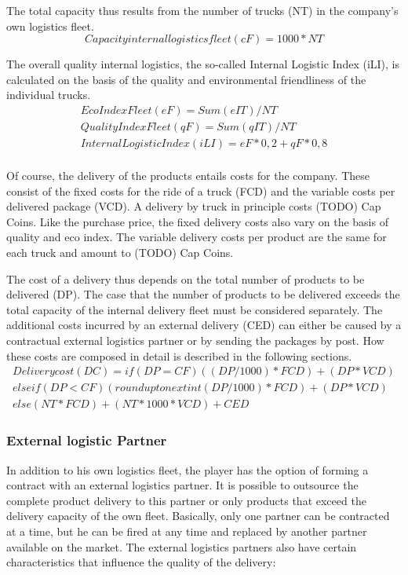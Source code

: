 The total capacity thus results from the number of trucks (NT) in the company's own logistics fleet. 
\begin{equation}
    Capacity internal logistics fleet (cF) = 1000 * NT
\end{equation}

The overall quality internal logistics, the so-called Internal Logistic Index (iLI), is calculated on the basis of the quality and environmental friendliness of the individual trucks.  
\begin{equation}
\begin{aligned}
    Eco Index Fleet (eF) = Sum (eIT) / NT \\
    Quality Index Fleet (qF) = Sum (qIT) / NT \\
    Internal Logistic Index (iLI) = eF * 0,2 + qF * 0,8 \\
\end{aligned}
\end{equation}

Of course, the delivery of the products entails costs for the company. These consist of the fixed costs for the ride of a truck (FCD) and the variable costs per delivered package (VCD). 
A delivery by truck in principle costs (TODO) Cap Coins. Like the purchase price, the fixed delivery costs also vary on the basis of quality and eco index. The variable delivery costs per product are the same for each truck and amount to (TODO) Cap Coins.

The cost of a delivery thus depends on the total number of products to be delivered (DP). 
The case that the number of products to be delivered exceeds the total capacity of the internal delivery fleet must be considered separately. The additional costs incurred by an external delivery (CED) can either be caused by a contractual external logistics partner or by sending the packages by post. How these costs are composed in detail is described in the following sections. 
\begin{equation}
\begin{aligned}
Delivery cost (DC) = if ( DP = CF ) { (( DP / 1000) * FCD) + ( DP * VCD) } \\
elseif ( DP < CF ) { (round up to next int ( DP / 1000) * FCD ) + ( DP * VCD) } \\
else { ( NT * FCD ) + ( NT *1000 * VCD ) + CED }
\end{aligned}
\end{equation}

\subsubsection{External logistic Partner}
In addition to his own logistics fleet, the player has the option of forming a contract with an external logistics partner. It is possible to outsource the complete product delivery to this partner or only products that exceed the delivery capacity of the own fleet. Basically, only one partner can be contracted at a time, but he can be fired at any time and replaced by another partner available on the market. 
The external logistics partners also have certain characteristics that influence the quality of the delivery: 

